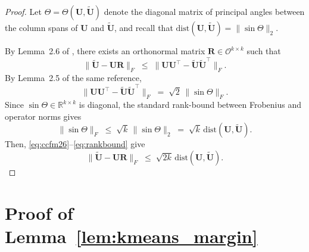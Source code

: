 \documentclass[11pt]{article}
\theoremstyle{plain}
\theoremstyle{definition}
\theoremstyle{remark}
\begin{document}
\begin{proof}
Let $\Theta = \Theta(\mathbf U, \widetilde{\mathbf U})$ denote the diagonal matrix of principal angles between the column spans of $\mathbf U$ and $\widetilde{\mathbf U}$, and recall that $\mathrm{dist}(\mathbf U, \widetilde{\mathbf U}) = \|\sin\Theta\|_2$.

By Lemma~2.6 of \citet{chen2021spectral}, there exists an orthonormal matrix $\mathbf R \in \mathcal{O}^{k\times k}$ such that
\begin{equation}\label{eq:ccfm26}
\|\widetilde{\mathbf U} - \mathbf U \mathbf R\|_F 
\;\le\; \|\mathbf U\mathbf U^{\top} - \widetilde{\mathbf U}\widetilde{\mathbf U}^{\top}\|_F.
\end{equation}
By Lemma~2.5 of the same reference,
\begin{equation}\label{eq:ccfm25}
\|\mathbf U\mathbf U^{\top} - \widetilde{\mathbf U}\widetilde{\mathbf U}^{\top}\|_F 
\;=\; \sqrt 2\,\|\sin\Theta\|_F.
\end{equation}
Since $\sin\Theta\in\mathbb{R}^{k\times k}$ is diagonal, the standard rank-bound between Frobenius and operator norms gives
\begin{equation}\label{eq:rankbound}
\|\sin\Theta\|_F \;\le\; \sqrt k\,\|\sin\Theta\|_2 \;=\; \sqrt k\,\mathrm{dist}(\mathbf U, \widetilde{\mathbf U}).
\end{equation}
Then, \eqref{eq:ccfm26}--\eqref{eq:rankbound} give
\[
\|\widetilde{\mathbf U} - \mathbf U \mathbf R\|_F \;\le\; \sqrt{2k}\,\mathrm{dist}(\mathbf U, \widetilde{\mathbf U}).
\]
\end{proof}


\section{Proof of Lemma~\ref{lem:kmeans_margin}}
\end{document}
